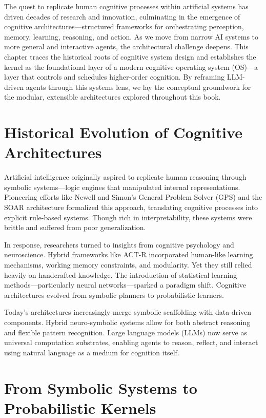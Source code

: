 \documentclass{book}
\begin{document}
The quest to replicate human cognitive processes within artificial systems has driven decades of research and innovation, culminating in the emergence of cognitive architectures—structured frameworks for orchestrating perception, memory, learning, reasoning, and action. As we move from narrow AI systems to more general and interactive agents, the architectural challenge deepens. This chapter traces the historical roots of cognitive system design and establishes the kernel as the foundational layer of a modern cognitive operating system (OS)—a layer that controls and schedules higher-order cognition. By reframing LLM-driven agents through this systems lens, we lay the conceptual groundwork for the modular, extensible architectures explored throughout this book.

\section{Historical Evolution of Cognitive Architectures}

Artificial intelligence originally aspired to replicate human reasoning through symbolic systems—logic engines that manipulated internal representations. Pioneering efforts like Newell and Simon’s General Problem Solver (GPS) and the SOAR architecture formalized this approach, translating cognitive processes into explicit rule-based systems. Though rich in interpretability, these systems were brittle and suffered from poor generalization.

In response, researchers turned to insights from cognitive psychology and neuroscience. Hybrid frameworks like ACT-R incorporated human-like learning mechanisms, working memory constraints, and modularity. Yet they still relied heavily on handcrafted knowledge. The introduction of statistical learning methods—particularly neural networks—sparked a paradigm shift. Cognitive architectures evolved from symbolic planners to probabilistic learners.

Today’s architectures increasingly merge symbolic scaffolding with data-driven components. Hybrid neuro-symbolic systems allow for both abstract reasoning and flexible pattern recognition. Large language models (LLMs) now serve as universal computation substrates, enabling agents to reason, reflect, and interact using natural language as a medium for cognition itself.

\section{From Symbolic Systems to Probabilistic Kernels}
\end{document}
